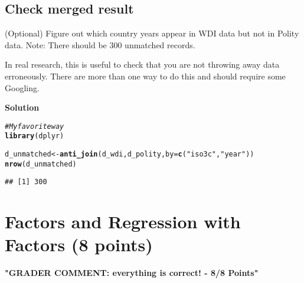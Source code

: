 \documentclass{article}\usepackage[]{graphicx}\usepackage[]{color}
\makeatletter
\newcommand{\hlstr}[1]{\textcolor[rgb]{0.192,0.494,0.8}{#1}}%
\newcommand{\hlcom}[1]{\textcolor[rgb]{0.678,0.584,0.686}{\textit{#1}}}%
\newcommand{\hlstd}[1]{\textcolor[rgb]{0.345,0.345,0.345}{#1}}%
\newcommand{\hlkwb}[1]{\textcolor[rgb]{0.69,0.353,0.396}{#1}}%
\newcommand{\hlkwc}[1]{\textcolor[rgb]{0.333,0.667,0.333}{#1}}%
\newcommand{\hlkwd}[1]{\textcolor[rgb]{0.737,0.353,0.396}{\textbf{#1}}}%
\newenvironment{kframe}{%
 \def\at@end@of@kframe{}%
 \ifinner\ifhmode%
  \def\at@end@of@kframe{\end{minipage}}%
  \begin{minipage}{\columnwidth}%
 \fi\fi%
 \def\FrameCommand##1{\hskip\@totalleftmargin \hskip-\fboxsep
 \colorbox{shadecolor}{##1}\hskip-\fboxsep
     \hskip-\linewidth \hskip-\@totalleftmargin \hskip\columnwidth}%
 \MakeFramed {\advance\hsize-\width
   \@totalleftmargin\z@ \linewidth\hsize
   \@setminipage}}%
 {\par\unskip\endMakeFramed%
 \at@end@of@kframe}
\newenvironment{knitrout}{}{} %
\makeatother
\begin{document}
\subsection{Check merged result}

(Optional) Figure out which country years appear in WDI data but not in Polity data. Note: There should be 300 unmatched records.

In real research, this is useful to check that you are not throwing away data erroneously. There are more than one way to do this and should require some Googling.

\textbf{Solution}

\begin{knitrout}
\color{fgcolor}\begin{kframe}
\begin{alltt}
\hlcom{# My favorite way}
\hlkwd{library}\hlstd{(dplyr)}
\end{alltt}


{\ttfamily\noindent\itshape\color{messagecolor}{\#\# \\\#\# Attaching package: 'dplyr'}}

{\ttfamily\noindent\itshape\color{messagecolor}{\#\# The following objects are masked from 'package:stats':\\\#\# \\\#\#\ \ \ \  filter, lag}}

{\ttfamily\noindent\itshape\color{messagecolor}{\#\# The following objects are masked from 'package:base':\\\#\# \\\#\#\ \ \ \  intersect, setdiff, setequal, union}}\begin{alltt}
\hlstd{d_unmatched} \hlkwb{<-} \hlkwd{anti_join}\hlstd{(d_wdi, d_polity,} \hlkwc{by} \hlstd{=} \hlkwd{c}\hlstd{(}\hlstr{"iso3c"}\hlstd{,} \hlstr{"year"}\hlstd{))}
\hlkwd{nrow}\hlstd{(d_unmatched)}
\end{alltt}
\begin{verbatim}
## [1] 300
\end{verbatim}
\end{kframe}
\end{knitrout}

\section{Factors and Regression with Factors (8 points)}

\textbf{\color{red} "GRADER COMMENT: everything is correct! - 8/8 Points"}
\end{document}
